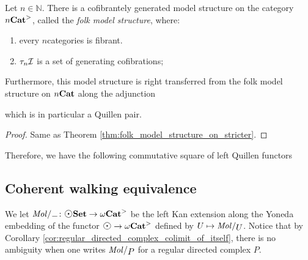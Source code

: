 \begin{thm} \label{thm:folk_model_structure_on_stricter_n}
    Let \( n \in \mathbb{N} \).
    There is a cofibrantely generated model structure on the category \( {n\mathbf{Cat}}^> \), called the \emph{folk model structure}, where:
    \begin{enumerate}
        \item every \( n \)\nbd categories is fibrant.
        \item \( \tau_{n}\mathcal{I} \) is a set of generating cofibrations;
    \end{enumerate}
    Furthermore, this model structure is right transferred from the folk model structure on \( {n\mathbf{Cat}} \) along the adjunction 
    \begin{center}
    \end{center}
    which is in particular a Quillen pair.
\end{thm}
\begin{proof}
    Same as Theorem \ref{thm:folk_model_structure_on_stricter}.
\end{proof}

\noindent Therefore, we have the following commutative square of left Quillen functors
\begin{center}
\end{center}

\subsection{Coherent walking equivalence}

We let \( \molecin{-} \colon \dgmSet \to \somegaCat \) be the left Kan extension along the Yoneda embedding of the functor \( \atom \to \somegaCat \) defined by \( U \mapsto \molecin{U} \).
Notice that by Corollary \ref{cor:regular_directed_complex_colimit_of_itself}, there is no ambiguity when one writes \( \molecin{P} \) for a regular directed complex \( P \).

